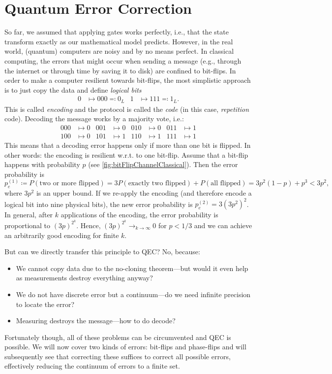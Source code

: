 \chapter{Quantum Error Correction}
	So far, we assumed that applying gates works perfectly, i.e., that the state transform exactly as our mathematical model predicts. However, in the real world, (quantum) computers are noisy and by no means perfect. In classical computing, the errors that might occur when sending a message (e.g., through the internet or through time by saving it to disk) are confined to bit-flips. In order to make a computer resilient towards bit-flips, the most simplistic approach is to just copy the data and define \emph{logical bits}
	\begin{align}
		0 &\mapsto 000 \eqqcolon 0_L &
		1 &\mapsto 111 \eqqcolon 1_L.
	\end{align}
	This is called \emph{encoding} and the protocol is called the \emph{code} (in this case, \emph{repetition} code). Decoding the message works by a majority vote, i.e.:
	\begin{align}
		000 &\mapsto 0 &
		001 &\mapsto 0 &
		010 &\mapsto 0 &
		011 &\mapsto 1 \\
		100 &\mapsto 0 &
		101 &\mapsto 1 &
		110 &\mapsto 1 &
		111 &\mapsto 1
	\end{align}
	This means that a decoding error happens only if more than one bit is flipped. In other words: the encoding is resilient w.r.t. to one bit-flip. Assume that a bit-flip happens with probability \(p\) (see \autoref{fig:bitFlipChannelClassical}). Then the error probability is
	\begin{equation}
		p_e^{(1)} \coloneqq P(\text{two or more flipped})
			= 3 P(\text{exactly two flipped}) + P(\text{all flipped})
			= 3 p^2 (1 - p) + p^3
			< 3p^2,
	\end{equation}
	where \( 3p^2 \) is an upper bound. If we re-apply the encoding (and therefore encode a logical bit into nine physical bits), the new error probability is \( p_e^{(2)} = 3 (3p^2)^2 \). In general, after \(k\) applications of the encoding, the error probability is proportional to \( (3p)^{2^k} \). Hence, \( (3p)^{2^k} \to_{k \to \infty} 0 \) for \(p < 1/3\) and we can achieve an arbitrarily good encoding for finite \(k\).

	But can we directly transfer this principle to \ac{QEC}? No, because:
	\begin{itemize}
		\item We cannot copy data due to the no-cloning theorem---but would it even help as measurements destroy everything anyway?
		\item We do not have discrete error but a continuum---do we need infinite precision to locate the error?
		\item Measuring destroys the message---how to do decode?
	\end{itemize}
	Fortunately though, all of these problems can be circumvented and \ac{QEC} is possible. We will now cover two kinds of errors: bit-flips and phase-flips and will subsequently see that correcting these suffices to correct all possible errors, effectively reducing the continuum of errors to a finite set.


